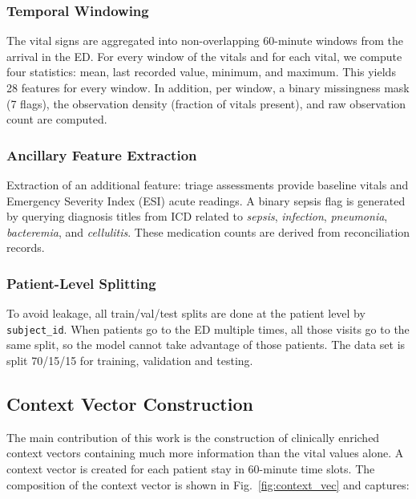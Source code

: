 \documentclass[runningheads]{llncs}
\begin{document}
\subsubsection{Temporal Windowing}
The vital signs are aggregated into non-overlapping 60-minute windows from the arrival in the ED. For every window of the vitals and for each vital, we compute four statistics: mean, last recorded value, minimum, and maximum. This yields 28 features for every window. In addition, per window, a binary missingness mask (7 flags), the observation density (fraction of vitals present), and raw observation count are computed.

\subsubsection{Ancillary Feature Extraction}
Extraction of an additional feature: triage assessments provide baseline vitals and Emergency Severity Index (ESI) acute readings. A binary sepsis flag is generated by querying diagnosis titles from ICD related to \textit{sepsis}, \textit{infection}, \textit{pneumonia}, \textit{bacteremia}, and \textit{cellulitis}. These medication counts are derived from reconciliation records.

\subsubsection{Patient-Level Splitting}
To avoid leakage, all train/val/test splits are done at the patient level by \texttt{subject\_id}. When patients go to the ED multiple times, all those visits go to the same split, so the model cannot take advantage of those patients. The data set is split 70/15/15 for training, validation and testing.

\subsection{Context Vector Construction}

The main contribution of this work is the construction of clinically enriched context vectors containing much more information than the vital values alone. A context vector is created for each patient stay in 60-minute time slots. The composition of the context vector is shown in Fig.~\ref{fig:context_vec} and captures:
\end{document}
